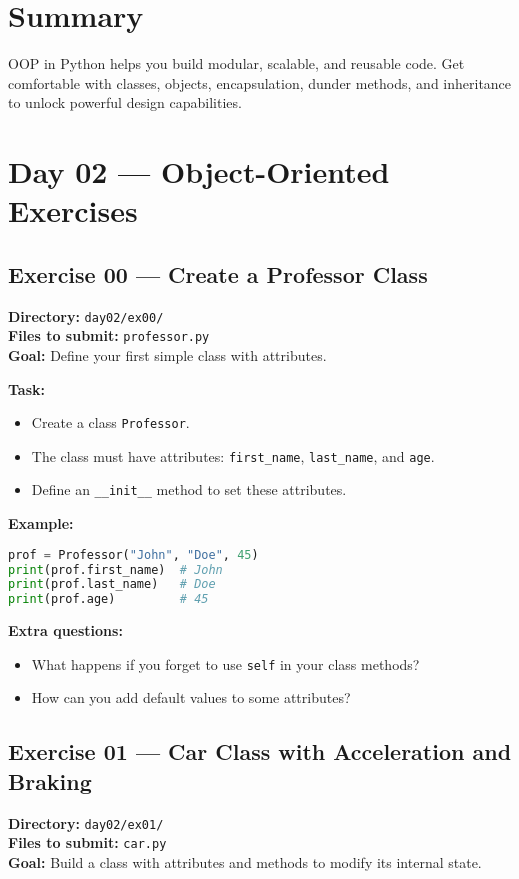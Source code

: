 \documentclass[12pt,a4paper]{article}
\begin{document}
\section*{Summary}
OOP in Python helps you build modular, scalable, and reusable code. Get comfortable with classes, objects, encapsulation, dunder methods, and inheritance to unlock powerful design capabilities.

\newpage
\section{Day 02 — Object-Oriented Exercises}

\subsection*{Exercise 00 — Create a Professor Class}
\textbf{Directory:} \texttt{day02/ex00/}\\
\textbf{Files to submit:} \texttt{professor.py}\\
\textbf{Goal:} Define your first simple class with attributes.

\textbf{Task:}
\begin{itemize}
  \item Create a class \texttt{Professor}.
  \item The class must have attributes: \texttt{first\_name}, \texttt{last\_name}, and \texttt{age}.
  \item Define an \texttt{\_\_init\_\_} method to set these attributes.
\end{itemize}

\textbf{Example:}
\begin{lstlisting}[language=Python]
prof = Professor("John", "Doe", 45)
print(prof.first_name)  # John
print(prof.last_name)   # Doe
print(prof.age)         # 45
\end{lstlisting}

\textbf{Extra questions:}
\begin{itemize}
  \item What happens if you forget to use \texttt{self} in your class methods?
  \item How can you add default values to some attributes?
\end{itemize}

\newpage
\subsection*{Exercise 01 — Car Class with Acceleration and Braking}
\textbf{Directory:} \texttt{day02/ex01/}\\
\textbf{Files to submit:} \texttt{car.py}\\
\textbf{Goal:} Build a class with attributes and methods to modify its internal state.
\end{document}
